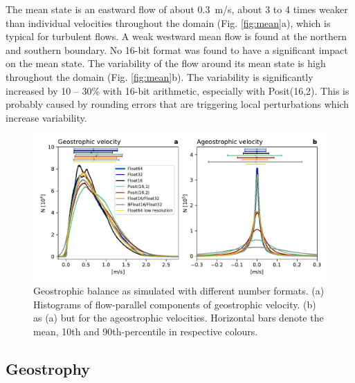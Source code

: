 The mean state is an eastward flow of about 0.3~m/s, about 3 to 4 times weaker than
individual velocities throughout the domain (Fig. \ref{fig:mean}a), which is typical
for turbulent flows. A weak westward mean flow is found at the northern and
southern boundary. No 16-bit format was found to have a significant impact on
the mean state. The variability of the flow around its mean state is high
throughout the domain (Fig. \ref{fig:mean}b). The variability is significantly
increased by 10 -- 30\% with 16-bit arithmetic, especially with Posit(16,2).
This is probably caused by rounding errors that are triggering local
perturbations which increase variability.

\begin{figure}
\includegraphics[width=1\textwidth]{Figures/swm/ageostrophic.pdf}
\caption{Geostrophic balance as simulated with different number formats.
(a) Histograms of flow-parallel components of geostrophic velocity.
(b) as (a) but for the ageostrophic velocities. Horizontal bars denote the
mean, 10th and 90th-percentile in respective colours.}
\label{fig:geo}
\end{figure}

\subsection{Geostrophy}

